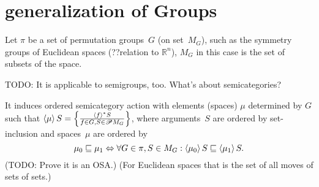 \chapter{generalization of Groups}

Let $\pi$ be a set of permutation groups~$G$ (on set~$M_G$), such as the symmetry groups of Euclidean spaces
(??relation to $\mathbb{R}^n$), $M_G$ in this case is the set of subsets of the space.

TODO: It is applicable to semigroups, too. What's about semicategories?

It induces ordered semicategory action with elements (spaces) $\mu$ determined by $G$ such that
$\left\langle \mu\right\rangle S=\left\{ \frac{\left\langle f\right\rangle ^{\ast}S}{f\in G,S\in\mathscr{P} M_G}\right\}$, where arguments~$S$ are ordered by set-inclusion
and spaces~$\mu$ are ordered by
\[ \mu_0\sqsubseteq\mu_1\Leftrightarrow\forall G\in\pi, S\in M_G:\left\langle \mu_0\right\rangle S\sqsubseteq\left\langle \mu_1\right\rangle S. \]
(TODO: Prove it is an OSA.)
(For Euclidean spaces that is the set of all moves of sets of sets.)